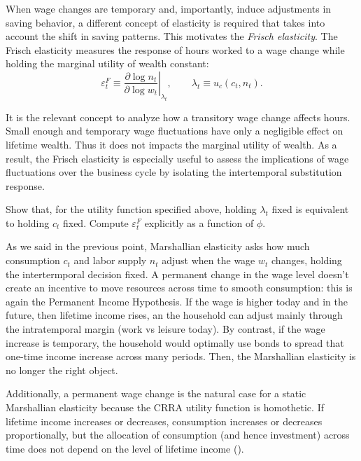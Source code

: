 \documentclass[dvipsnames,11pt]{article}
\begin{document}
\begin{enumerate}
        When wage changes are temporary and, importantly, induce adjustments in saving behavior, a different concept of elasticity is required that takes into account the shift in saving patterns. This motivates the \textit{Frisch elasticity}. The Frisch elasticity measures the response of hours worked to a wage change while holding the marginal utility of wealth constant:
        \[
        \varepsilon_t^{F}
        \equiv 
        \left.\frac{\partial \log n_t}{\partial \log w_t}\right|_{\lambda_t},
        \qquad 
        \lambda_t \equiv u_c(c_t,n_t).
        \]
        
        It is the relevant concept to analyze how a transitory wage change affects hours. Small enough and temporary wage fluctuations have only a negligible effect on lifetime wealth. Thus it does not impacts the marginal utility of wealth. As a result, the Frisch elasticity is especially useful to assess the implications of wage fluctuations over the business cycle by isolating the intertemporal substitution response.

        Show that, for the utility function specified above, holding $\lambda_t$ fixed is equivalent to holding $c_t$ fixed. Compute $\varepsilon_t^{F}$ explicitly as a function of $\phi$.

        \begin{solution}

        As we said in the previous point, Marshallian elasticity asks how much consumption $c_t$ and labor supply $n_t$ adjust when the wage $w_t$ changes, holding the intertermporal decision fixed. A permanent change in the wage level doesn't create an incentive to move resources across time to smooth consumption: this is again the Permanent Income Hypothesis. If the wage is higher today and in the future, then lifetime income rises, an the household can adjust mainly through the intratemporal margin (work vs leisure today). By contrast, if the wage increase is temporary, the household would optimally use bonds to spread that one-time income increase across many periods. Then, the Marshallian elasticity is no longer the right object. 

        Additionally, a permanent wage change is the natural case for a static Marshallian elasticity because the CRRA utility function is homothetic. If lifetime income increases or decreases, consumption increases or decreases proportionally, but the allocation of consumption (and hence investment) across time does not depend on the level of lifetime income (\cite{krueger2012macroeconomic}). 


\end{solution}
\end{enumerate}
\end{document}
